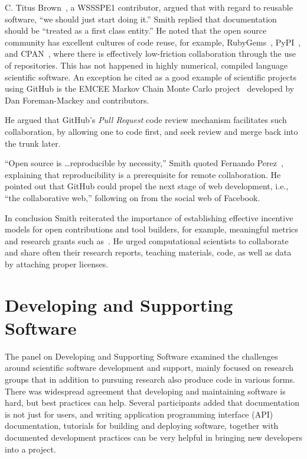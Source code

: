 \documentclass[11pt, oneside]{amsart}
\newcommand{\note}[1]{ {\textcolor{red}    { #1 }}}
\begin{document}
C. Titus Brown~\cite{ged-web}, a WSSSPE1 contributor, argued that with
regard to reusable software, ``we should just start doing it.''  Smith
replied that documentation should be ``treated as a first class
entity.''  He noted that the open source community has excellent
cultures of code reuse, for example, RubyGems~\cite{rubygems-web},
PyPI~\cite{pypi-web}, and CPAN~\cite{cpan-web}, where there is
effectively low-friction collaboration through the use of
repositories. This has not happened in highly numerical, compiled
language scientific software.  An exception he cited as a good example
of scientific projects using GitHub is the EMCEE Markov Chain Monte
Carlo project~\cite{emcee-web} developed by Dan Foreman-Mackey and contributors.

He argued that GitHub's \emph{Pull Request} code review mechanism
facilitates such collaboration, by allowing one to code first, and
seek review and merge back into the trunk later.

``Open source is \ldots reproducible by necessity,'' Smith quoted
Fernando Perez~\cite{perez-open-src-reproducible}, explaining that
reproducibility is a prerequisite for remote collaboration.  He
pointed out that GitHub could propel the next stage of web
development, i.e., ``the collaborative web,'' following on from the
social web of Facebook.

In conclusion Smith reiterated the importance of establishing
effective incentive models for open contributions and tool builders,
for example, meaningful metrics and research grants such
as~\cite{NSF_software_vision}. He urged computational scientists to
collaborate and share often their research reports, teaching
materials, code, as well as data by attaching proper licenses.

\section{Developing and Supporting Software} \label{sec:devel}%

The panel on Developing and Supporting Software examined the
challenges around scientific software development and support, mainly
focused on research groups that in addition to pursuing research also
produce code in various forms. There was widespread agreement that
developing and maintaining software is hard, but best practices can
help. Several participants added that documentation is not just for
users, and writing application programming interface (API)
documentation, tutorials for building and deploying software, together
with documented development practices can be very helpful in bringing
new developers into a project.
\end{document}
